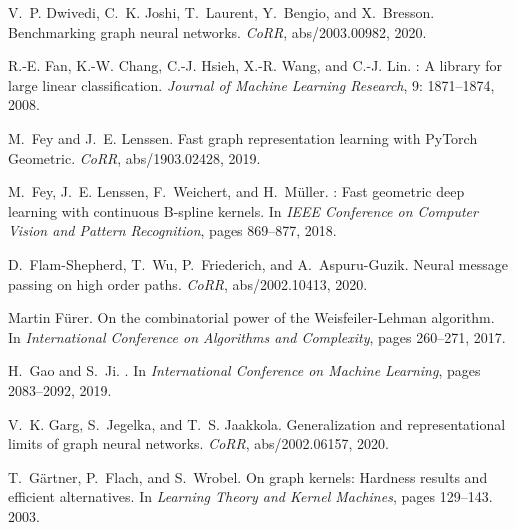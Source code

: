 \documentclass{article}
\theoremstyle{definition}
\begin{document}
\begin{thebibliography}{125}
	V.~P. Dwivedi, C.~K. Joshi, T.~Laurent, Y.~Bengio, and X.~Bresson.
	\newblock Benchmarking graph neural networks.
	\newblock \emph{CoRR}, abs/2003.00982, 2020.
	
	R.-E. Fan, K.-W. Chang, C.-J. Hsieh, X.-R. Wang, and C.-J. Lin.
	: {A} library for large linear classification.
	\newblock \emph{Journal of Machine Learning Research}, 9: 1871--1874,
	2008.
	
	M.~Fey and J.~E. Lenssen.
	\newblock Fast graph representation learning with {PyTorch Geometric}.
	\newblock \emph{CoRR}, abs/1903.02428, 2019.
	
	M.~Fey, J.~E. Lenssen, F.~Weichert, and H.~M{\"u}ller.
	: Fast geometric deep learning with continuous {B}-spline
	kernels.
	\newblock In \emph{IEEE Conference on Computer Vision and Pattern Recognition},
	pages 869--877, 2018.
	
	D.~Flam{-}Shepherd, T.~Wu, P.~Friederich, and A.~Aspuru{-}Guzik.
	\newblock Neural message passing on high order paths.
	\newblock \emph{CoRR}, abs/2002.10413, 2020.
	
	Martin F{\"{u}}rer.
	\newblock On the combinatorial power of the {Weisfeiler-Lehman} algorithm.
	\newblock In \emph{International Conference on Algorithms and Complexity},
	pages 260--271, 2017.
	
	H.~Gao and S.~Ji.
	.
	\newblock In \emph{International Conference on Machine Learning}, pages
	2083--2092, 2019.
	
	V.~K. Garg, S.~Jegelka, and T.~S. Jaakkola.
	\newblock Generalization and representational limits of graph neural networks.
	\newblock \emph{CoRR}, abs/2002.06157, 2020.
	
	T.~G\"{a}rtner, P.~Flach, and S.~Wrobel.
	\newblock On graph kernels: Hardness results and efficient alternatives.
	\newblock In \emph{Learning Theory and Kernel Machines}, pages 129--143. 2003.
	

\end{thebibliography}
\end{document}
